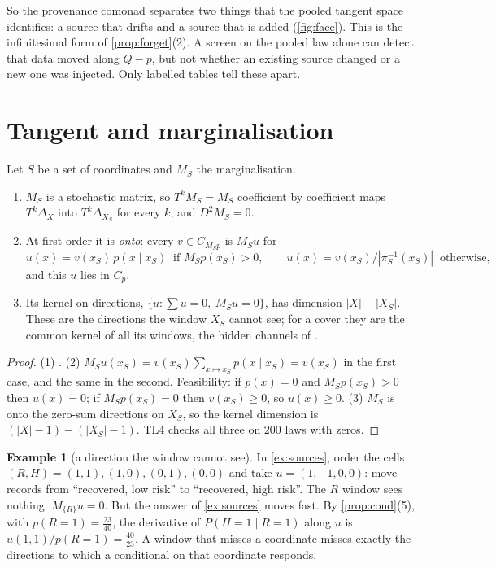 \documentclass[11pt]{article}
\theoremstyle{definition}\newtheorem{definition}[theorem]{Definition}\newtheorem{remark}[theorem]{Remark}\newtheorem{example}[theorem]{Example}
\begin{document}
So the provenance comonad separates two things that the pooled tangent space identifies: a source that drifts and a source that is
added (\cref{fig:face}). This is the infinitesimal form of \cref{prop:forget}(2). A screen on the pooled law alone can detect that data
moved along $Q-p$, but not whether an existing source changed or a new one was injected. Only labelled tables tell these apart.

\section{Tangent and marginalisation}\label{sec:tm}
\begin{proposition}\label{prop:tm}
Let $S$ be a set of coordinates and $M_S$ the marginalisation.
\begin{enumerate}
\item[(1)] $M_S$ is a stochastic matrix, so $T^kM_S=M_S$ coefficient by coefficient maps $T^k\Delta_X$ into $T^k\Delta_{X_S}$ for every $k$,
  and $D^2M_S=0$.
\item[(2)] At first order it is \emph{onto}: every $v\in C_{M_Sp}$ is $M_Su$ for
  \[
  u(x)=v(x_S)\,p(x\mid x_S)\ \text{ if }M_Sp(x_S)>0,\qquad u(x)=v(x_S)/|\pi_S^{-1}(x_S)|\ \text{ otherwise},
  \]
  and this $u$ lies in $C_p$.
\item[(3)] Its kernel on directions, $\{u:\sum u=0,\ M_Su=0\}$, has dimension $|X|-|X_S|$. These are the directions the window $X_S$
  cannot see; for a cover they are the common kernel of all its windows, the hidden channels of \cite[Theorem F]{Lab}.
\end{enumerate}
\end{proposition}

\begin{proof}
(1) \cite[Proposition ``morphisms'']{TangentCompanion}. (2) $M_Su(x_S)=v(x_S)\sum_{x\mapsto x_S}p(x\mid x_S)=v(x_S)$ in the first case, and the
same in the second. Feasibility: if $p(x)=0$ and $M_Sp(x_S)>0$ then $u(x)=0$; if $M_Sp(x_S)=0$ then $v(x_S)\ge0$, so $u(x)\ge0$. (3) $M_S$ is onto
the zero-sum directions on $X_S$, so the kernel dimension is $(|X|-1)-(|X_S|-1)$. TL4 checks all three on $200$ laws with zeros.
\end{proof}

\begin{example}[a direction the window cannot see]\label{ex:invisible}
In \cref{ex:sources}, order the cells $(R,H)=(1,1),(1,0),(0,1),(0,0)$ and take $u=(1,-1,0,0)$: move records from ``recovered, low risk'' to
``recovered, high risk''. The $R$ window sees nothing: $M_{\{R\}}u=0$. But the answer of \cref{ex:sources} moves fast. By
\cref{prop:cond}(5), with $p(R{=}1)=\tfrac{23}{40}$, the derivative of $P(H{=}1\mid R{=}1)$ along $u$ is $u(1,1)/p(R{=}1)=\tfrac{40}{23}$. A
window that misses a coordinate misses exactly the directions to which a conditional on that coordinate responds.
\end{example}
\end{document}
